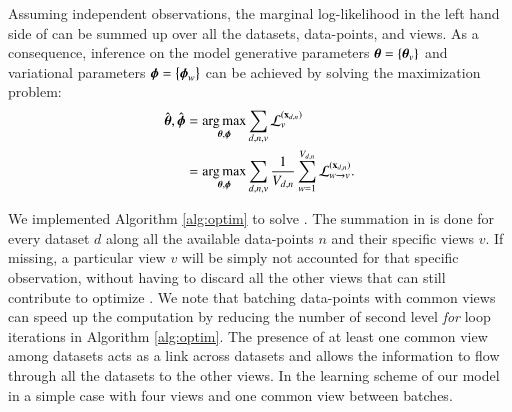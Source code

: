 Assuming independent observations, the marginal log-likelihood in the left hand side of  can be summed up over all the datasets, data-points, and views.
As a consequence, inference on the model generative parameters $\boldsymbol{\theta} = \left\{\boldsymbol{\theta}_v\right\}$ and variational parameters $\boldsymbol{\phi} = \left\{\boldsymbol{\phi}_w\right\}$ can be achieved by solving the maximization problem:
\begin{equation}\label{eq:argmax}
\begin{aligned}
\hat{\boldsymbol{\theta}}, \hat{\boldsymbol{\phi}} &= \underset{\boldsymbol{\theta}, \boldsymbol{\phi}}{\operatorname{arg\,max}} \sum_{d,n,v} \mathcal{L}_v^{(\mathbf{x}_{d,n})} \\
                           &= \underset{\boldsymbol{\theta}, \boldsymbol{\phi}}{\operatorname{arg\,max}} \sum_{d,n,v} \frac{1}{V_{d,n}} \sum_{w=1}^{V_{d,n}} \mathcal{L}_{w \rightarrow v}^{(\mathbf{x}_{d,n})}.
\end{aligned}
\end{equation}
%

%
We implemented Algorithm \ref{alg:optim} to solve .
The summation in  is done for every dataset $d$ along all the available data-points $n$ and their specific views $v$.
If missing, a particular view $v$ will be simply not accounted for that specific observation, without having to discard all the other views that can still contribute to optimize .
We note that batching data-points with common views can speed up the computation by reducing the number of second level \textit{for} loop iterations in Algorithm \ref{alg:optim}.
The presence of at least one common view among datasets acts as a link across datasets and allows the information to flow through all the datasets to the other views.
In  the learning scheme of our model in a simple case with four views and one common view between batches.



